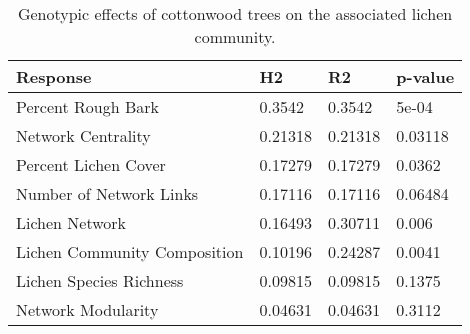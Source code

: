 \begin{table}[ht]
\centering
\begin{tabular}{llll}
  \hline
Response & H2 & R2 & p-value \\ 
  \hline
Percent Rough Bark & 0.3542 & 0.3542 & 5e-04 \\ 
  Network Centrality & 0.21318 & 0.21318 & 0.03118 \\ 
  Percent Lichen Cover & 0.17279 & 0.17279 & 0.0362 \\ 
  Number of Network Links & 0.17116 & 0.17116 & 0.06484 \\ 
  Lichen Network & 0.16493 & 0.30711 & 0.006 \\ 
  Lichen Community Composition & 0.10196 & 0.24287 & 0.0041 \\ 
  Lichen Species Richness & 0.09815 & 0.09815 & 0.1375 \\ 
  Network Modularity & 0.04631 & 0.04631 & 0.3112 \\ 
   \hline
\end{tabular}
\caption{Genotypic effects of cottonwood trees on the associated lichen community.} 
\label{tab:h2_table}
\end{table}
